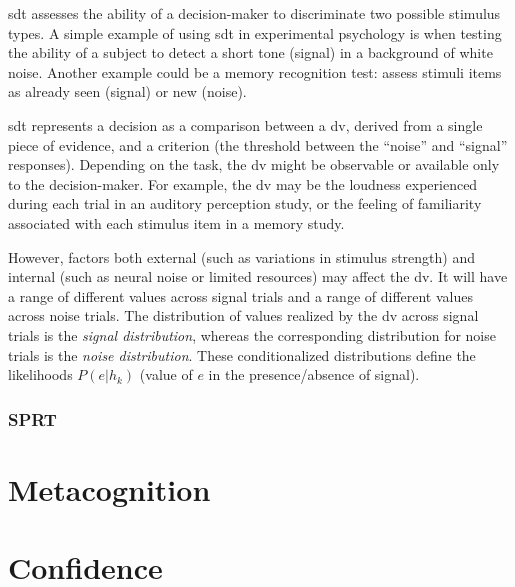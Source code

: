\acrshort{sdt} assesses the ability of a decision-maker to discriminate two possible stimulus types. A simple example of using \acrshort{sdt} in experimental psychology is when testing the ability of a subject to detect a short tone (signal) in a background of white noise. Another example could be a memory recognition test: assess stimuli items as already seen (signal) or new (noise).

\acrshort{sdt} represents a decision as a comparison between a \acrfull{dv}, derived from a single piece of evidence, and a criterion (the threshold between the “noise” and “signal” responses). Depending on the task, the \acrshort{dv} might be observable or available only to the decision-maker. For example, the \acrshort{dv} may be the loudness experienced during each trial in an auditory perception study, or the feeling of familiarity associated with each stimulus item in a memory study.

However, factors both external (such as variations in stimulus strength) and internal (such as neural noise or limited resources) may affect the \acrshort{dv}. It will have a range of different values across signal trials and a range of different values across noise trials. The distribution of values realized by the \acrshort{dv} across signal trials is the \textit{signal distribution}, whereas the corresponding distribution for noise trials is the \textit{noise distribution}. These conditionalized distributions define the likelihoods $P(e|h_k)$ (value of $e$ in the presence/absence of signal).

\subsubsection{SPRT}

\section{Metacognition}

\section{Confidence}